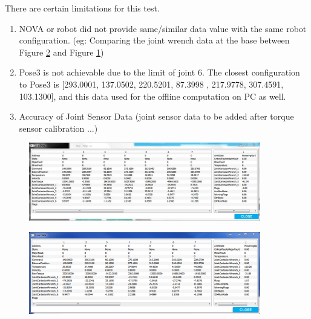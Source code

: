 
There are certain limitations for this test.

\begin{enumerate}
	\item NOVA or robot did not provide same/similar data value with the same robot configuration. (eg: Comparing the joint wrench data at the base between Figure \ref{fig:pose6discarded} and Figure \ref{fig:pose6used})
	\item Pose3 is not achievable due to the limit of joint 6. The closest configuration to Pose3 is [293.0001,   137.0502,  220.5201,  87.3998 ,  217.9778,  307.4591,  103.1300], and this data used for the offline computation on PC as well.
	\item Accuracy of Joint Sensor Data (joint sensor data to be added  after torque sensor calibration ...)
\end{enumerate}


\begin{figure}
	\begin{center}
		\includegraphics[width=0.9\textwidth]{./images/Pose6}%
		\label{fig:pose6used}
	\end{center}
\end{figure}

\begin{figure}
	\begin{center}
		\includegraphics[width=0.9\textwidth]{./images/Pose6_old}%
		\label{fig:pose6discarded}
	\end{center}
\end{figure}

